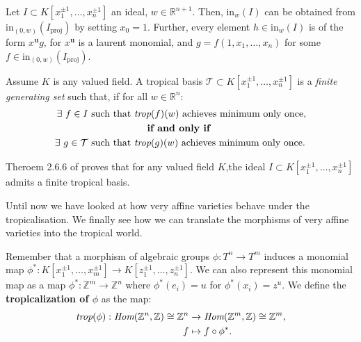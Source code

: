 \begin{proposition}
    Let $I \subset  K[x_{1}^{\pm1}, \dots, x_{n}^{\pm1}]$ an ideal, $w \in \mathbb{R}^{n+1}$.
    Then, $\text{in}_{w}(I)$ can be obtained from $\text{in}_{(0,w)}(I_{\text{proj}})$ by setting $x_{0} = 1$.
    Further, every element $h \in \text{in}_{w}(I)$ is of the form $x^{\textbf{u}}g$, for $x^{\textbf{u}}$ is a laurent monomial, and $g = f(1, x_{1},\dots, x_{n})$ for some $f \in \text{in}_{(0,w)}(I_{\text{proj}})$.
\end{proposition}

\begin{definition}
   Assume $K$ is any valued field.
   A tropical basis $\mathcal{T}\subset K[x_1^{\pm 1}, \dots, x_n^{\pm 1}]$ is a \textit{finite generating set} such that, if for all $w \in \mathbb{R}^{n}$:
    \begin{align*}
        \exists ~f \in I~\text{such that }&\emph{trop}(f)(w)~\text{achieves minimum only once},\\
                                                          &~~~~\textbf{if and only if}\\
        \exists ~g \in \mathcal{T}~\text{such that }&\emph{trop}(g)(w)~\text{achieves minimum only once}.
    \end{align*}
\end{definition}

\begin{remark}
    Theroem 2.6.6 of \cite{maclagan2015introduction} proves that for any valued field $K$,the ideal $I \subset  K[x_{1}^{\pm1}, \dots, x_{n}^{\pm1}]$ admits a finite tropical basis.
\end{remark}

Until now we have looked at how very affine varieties behave under the tropicalisation.
We finally see how we can translate the morphisms of very affine varieties into the tropical world.

\begin{definition}
    \par Remember that a morphism of algebraic groups $\phi : T^{n}\to T^{m}$ induces a monomial map $\phi^{*}:K[x_1^{\pm 1}, \dots, x_m^{\pm 1}]\to K[z_1^{\pm 1}, \dots, z_n^{\pm 1}]$. 
    We can also represent this monomial map as a map $\phi^{*}: \mathbb{Z}^{m}\to \mathbb{Z}^{n}$ where $\phi^{*}(e_i) = u$ for $\phi^{*}(x_i) = z^u$. 
    We define the \textbf{tropicalization of $\phi$} as the map:
    \begin{align*}
        \emph{trop}(\phi): \emph{Hom}(\mathbb{Z}^{n},\mathbb{Z})\cong \mathbb{Z}^{n} &\to \emph{Hom}(\mathbb{Z}^{m},\mathbb{Z})\cong \mathbb{Z}^{m},\\
        f &\mapsto f \circ \phi^{*}.
    \end{align*}
\end{definition}

